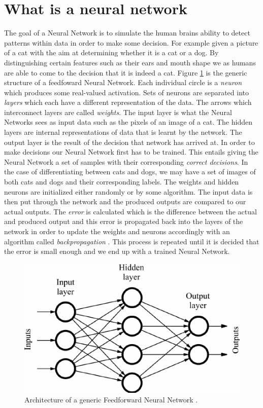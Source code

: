 \section{What is a neural network}
The goal of a Neural Network is to simulate the human brains ability to detect patterns within data in order to make some decision. For example given a picture of a cat with the aim at determining whether it is a cat or a dog. By distinguishing certain features such as their ears and mouth shape we as humans are able to come to the decision that it is indeed a cat. Figure \ref{fig-ff-nn} is the generic structure of a feedfoward Neural Network. Each individual circle is a \emph{neuron} which produces some real-valued activation. Sets of neurons are separated into \emph{layers} which each have a different representation of the data. The arrows which interconnect layers are called \emph{weights}. The input layer is what the Neural Networks sees as input data such as the pixels of an image of a cat. The hidden layers are internal representations of data that is learnt by the network. The output layer is the result of the decision that network has arrived at. In order to make decisions our Neural Network first has to be trained. This entails giving the Neural Network a set of samples with their corresponding \emph{correct decisions}. In the case of differentiating between cats and dogs, we may have a set of images of both cats and dogs and their corresponding labels. The weights and hidden neurons are initialized either randomly or by some algorithm. The input data is then put through the network and the produced outputs are compared to our actual outputs. The \emph{error} is calculated which is the difference between the actual and produced output and this error is propagated back into the layers of the network in order to update the weights and neurons accordingly with an algorithm called \emph{backpropagation} \cite{10.5555/65669.104451}\cite{10.5555/525960}. This process is repeated until it is decided that the error is small enough and we end up with a trained Neural Network.


\begin  {figure}[!htpb]
\centering
  \includegraphics[width=0.9\linewidth]{Credit_Images/Sample-of-a-feed-forward-neural-network.png}
   \caption{Architecture of a generic Feedforward Neural Network \cite{inbook}.}
    \label{fig-ff-nn}
\end{figure}

